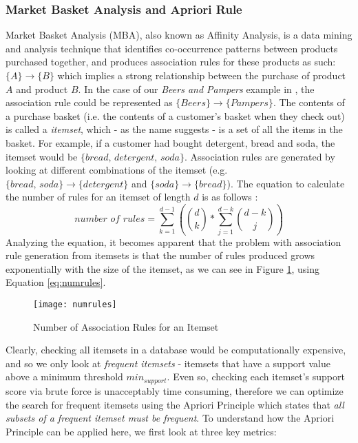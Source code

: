 \documentclass[a4paper,11pt]{article}
\newcommand{\setA}{\{A\}}
\newcommand{\setB}{\{B\}}
\newcommand{\abrule}{\setA\rightarrow\setB}
\begin{document}
\subsubsection{Market Basket Analysis and Apriori Rule}
Market Basket Analysis (MBA), also known as Affinity Analysis, is a data mining and analysis technique that identifies co-occurrence patterns between products purchased together, and produces association rules for these products as such: $\abrule$ which implies a strong relationship between the purchase of product $A$ and product $B$. In the case of our \textit{Beers and Pampers} example in \cite{beers_diapers}, the association rule could be represented as $\{Beers\} \rightarrow \{Pampers\}$. The contents of a purchase basket (i.e. the contents of a customer's basket when they check out) is called a \textit{itemset}, which - as the name suggests - is a set of all the items in the basket.  For example, if a customer had bought detergent, bread and soda, the itemset would be $\{\textit{bread, detergent, soda}\}$. Association rules are generated by looking at different combinations of the itemset (e.g. $\{\textit{bread, soda}\}\rightarrow\{\textit{detergent}\}$ and $\{\textit{soda}\}\rightarrow\{\textit{bread}\}$). 
The equation \cite{num_rules} to calculate the number of rules for an itemset of length $d$ is as follows :\\
\begin{equation}
\textit{number of rules} = \sum\limits_{k=1}^{d-1} \left(\binom{d}{k} * \sum\limits_{j=1}^{d-k}\binom{d-k}{j}  \right)
\label{eq:numrules}
\end{equation}
Analyzing the equation, it becomes apparent that the problem with association rule generation from itemsets is that the number of rules produced grows exponentially with the size of the itemset, as we can see in Figure \ref{fig:numrules}, using Equation \ref{eq:numrules}.  
\begin{figure}[H]
\centering
\texttt{[image: numrules]}
\caption{Number of Association Rules for an Itemset}
\label{fig:numrules}
\end{figure}
Clearly, checking all itemsets in a database would be computationally expensive, and so we only look at \textit{frequent itemsets} - itemsets that have a support value above a minimum threshold $\textit{min}_{\textit{support}}$. Even so, checking each itemset's support score via brute force is unacceptably time consuming, therefore we can optimize the search for frequent itemsets using the Apriori Principle \cite{apriori} which states that \textit{all subsets of a frequent itemset must be frequent}. To understand how the Apriori Principle can be applied here, we first look at three key metrics:
\end{document}
